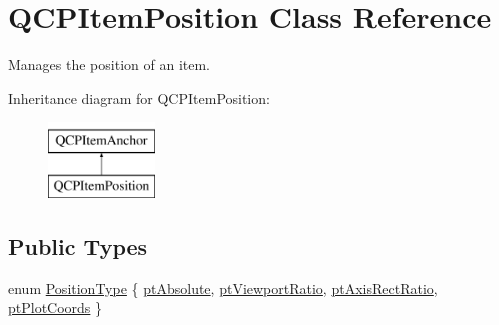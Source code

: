 \hypertarget{classQCPItemPosition}{\section{Q\-C\-P\-Item\-Position Class Reference}
\label{classQCPItemPosition}
}


Manages the position of an item.  


Inheritance diagram for Q\-C\-P\-Item\-Position\-:\begin{figure}[H]
\begin{center}
\leavevmode
\includegraphics[height=2.000000cm]{classQCPItemPosition}
\end{center}
\end{figure}
\subsection*{Public Types}
\begin{DoxyCompactItemize}
\item 
enum \hyperlink{classQCPItemPosition_aad9936c22bf43e3d358552f6e86dbdc8}{Position\-Type} \{ \hyperlink{classQCPItemPosition_aad9936c22bf43e3d358552f6e86dbdc8a564f5e53e550ead1ec5fc7fc7d0b73e0}{pt\-Absolute}, 
\hyperlink{classQCPItemPosition_aad9936c22bf43e3d358552f6e86dbdc8ac7d6aa89ceacb39658b0d6da061c789a}{pt\-Viewport\-Ratio}, 
\hyperlink{classQCPItemPosition_aad9936c22bf43e3d358552f6e86dbdc8a01080fd00eaf09fa238ef6b73bbfef75}{pt\-Axis\-Rect\-Ratio}, 
\hyperlink{classQCPItemPosition_aad9936c22bf43e3d358552f6e86dbdc8ad5ffb8dc99ad73263f7010c77342294c}{pt\-Plot\-Coords}
 \}
\end{DoxyCompactItemize}

